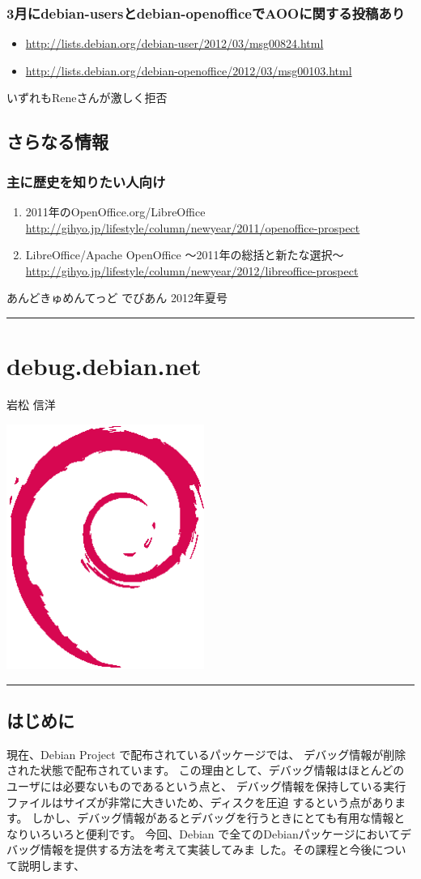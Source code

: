 \documentclass[mingoth,a4paper]{jsarticle}
\renewcommand{\dancersection}[2]{%
\newpage
あんどきゅめんてっど でびあん 2012年夏号
%
\vspace{0.1mm}\\
{\color{dancerdarkblue}\rule{\hsize}{2mm}}

%
%
\begin{minipage}[t]{0.6\hsize}
\color{dancerdarkblue}
\vspace{1cm}
\section{#1}
\hfill{}#2\\
\end{minipage}
\begin{minipage}[t]{0.4\hsize}
\vspace{-2cm}
\hfill{}\includegraphics[height=8cm]{image200502/openlogo-nd.eps}\\
\vspace{-5cm}
\end{minipage}
%
{\color{dancerlightblue}\rule{0.66\hsize}{2mm}}
%
\vspace{2cm}
}
\begin{document}
\subsubsection{3月にdebian-usersとdebian-openofficeでAOOに関する投稿あり}
\begin{itemize}
\item \url{http://lists.debian.org/debian-user/2012/03/msg00824.html}
\item \url{http://lists.debian.org/debian-openoffice/2012/03/msg00103.html}
\end{itemize}
いずれもReneさんが激しく拒否

\subsection{さらなる情報}
\subsubsection{主に歴史を知りたい人向け}
\begin{enumerate}
\item 2011年のOpenOffice.org/LibreOffice
\\
\url{http://gihyo.jp/lifestyle/column/newyear/2011/openoffice-prospect}
\item LibreOffice/Apache OpenOffice 〜2011年の総括と新たな選択〜
\\
\url{http://gihyo.jp/lifestyle/column/newyear/2012/libreoffice-prospect}
\end{enumerate}

\dancersection{debug.debian.net}{岩松 信洋}
\label{sec:debug.debian.net}

\subsection{はじめに}
現在、Debian Project で配布されているパッケージでは、
デバッグ情報が削除された状態で配布されています。
この理由として、デバッグ情報はほとんどのユーザには必要ないものであるという点と、
デバッグ情報を保持している実行ファイルはサイズが非常に大きいため、ディスクを圧迫
するという点があります。
しかし、デバッグ情報があるとデバッグを行うときにとても有用な情報となりいろいろと便利です。
今回、Debian で全てのDebianパッケージにおいてデバッグ情報を提供する方法を考えて実装してみま
した。その課程と今後について説明します、
\end{document}
